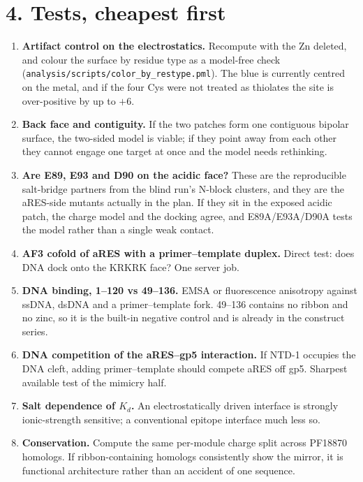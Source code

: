 \documentclass[11pt,a4paper]{article}
\begin{document}
\section*{4. Tests, cheapest first}

\begin{enumerate}[leftmargin=1.6em,itemsep=2pt]
  \item \textbf{Artifact control on the electrostatics.} Recompute with the Zn deleted, and colour the
        surface by residue type as a model-free check
        (\texttt{analysis/scripts/color\_by\_restype.pml}). The blue is currently centred on the metal,
        and if the four Cys were not treated as thiolates the site is over-positive by up to $+6$.
  \item \textbf{Back face and contiguity.} If the two patches form one contiguous bipolar surface, the
        two-sided model is viable; if they point away from each other they cannot engage one target at
        once and the model needs rethinking.
  \item \textbf{Are E89, E93 and D90 on the acidic face?} These are the reproducible salt-bridge
        partners from the blind run's N-block clusters, and they are the aRES-side mutants actually in
        the plan. If they sit in the exposed acidic patch, the charge model and the docking agree, and
        E89A/E93A/D90A tests the model rather than a single weak contact.
  \item \textbf{AF3 cofold of aRES with a primer--template duplex.} Direct test: does DNA dock onto the
        KRKRK face? One server job.
  \item \textbf{DNA binding, 1--120 vs 49--136.} EMSA or fluorescence anisotropy against ssDNA, dsDNA
        and a primer--template fork. 49--136 contains no ribbon and no zinc, so it is the built-in
        negative control and is already in the construct series.
  \item \textbf{DNA competition of the aRES--gp5 interaction.} If NTD-1 occupies the DNA cleft, adding
        primer--template should compete aRES off gp5. Sharpest available test of the mimicry half.
  \item \textbf{Salt dependence of $K_d$.} An electrostatically driven interface is strongly
        ionic-strength sensitive; a conventional epitope interface much less so.
  \item \textbf{Conservation.} Compute the same per-module charge split across PF18870 homologs. If
        ribbon-containing homologs consistently show the mirror, it is functional architecture rather
        than an accident of one sequence.
\end{enumerate}
\end{document}
